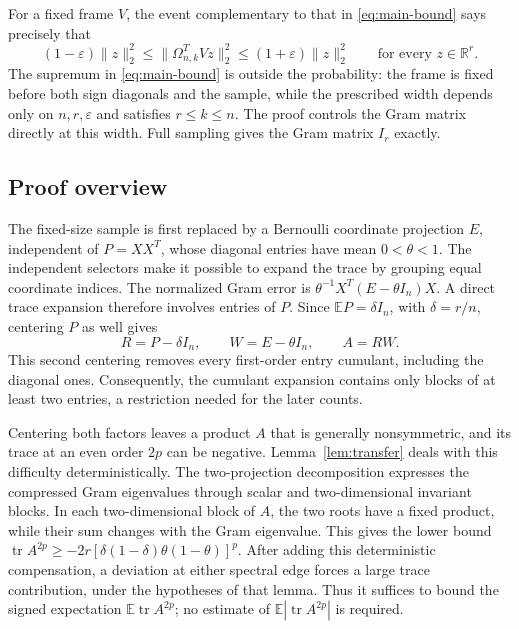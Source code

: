 \documentclass[11pt]{article}
\theoremstyle{definition}
\theoremstyle{remark}
\theoremstyle{plain}
\newcommand{\E}{\mathbb E}
\newcommand{\R}{\mathbb R}
\DeclareMathOperator{\tr}{tr}
\begin{document}
For a fixed frame $V$, the event complementary to that in
\eqref{eq:main-bound} says precisely that
\[
 (1-\varepsilon)\|z\|_2^2
 \le \|\Omega_{n,k}^T Vz\|_2^2
 \le (1+\varepsilon)\|z\|_2^2
 \qquad\text{for every }z\in\R^r.
\]
The supremum in \eqref{eq:main-bound} is outside the probability:
the frame is fixed before both sign diagonals and the sample, while
the prescribed width depends only on $n,r,\varepsilon$ and satisfies
$r\le k\le n$. The proof controls the Gram matrix directly at this
width. Full sampling gives the Gram matrix $I_r$ exactly.

\subsection*{Proof overview}

The fixed-size sample is first replaced by a Bernoulli coordinate
projection $E$, independent of $P=XX^T$, whose diagonal entries
have mean $0<\theta<1$. The independent selectors make it possible to
expand the trace by grouping equal coordinate indices. The normalized
Gram error is $\theta^{-1}X^T(E-\theta I_n)X$.
A direct trace expansion therefore involves entries of $P$.
Since $\E P=\delta I_n$, with $\delta=r/n$, centering $P$ as well gives
\[
 R=P-\delta I_n,\qquad W=E-\theta I_n,\qquad A=RW.
\]
This second centering removes every first-order entry cumulant,
including the diagonal ones. Consequently, the cumulant expansion
contains only blocks of at least two entries, a restriction needed
for the later counts.

Centering both factors leaves a product $A$ that is generally
nonsymmetric, and its trace at an even order $2p$ can be negative.
Lemma~\ref{lem:transfer} deals with this difficulty deterministically.
The two-projection decomposition expresses the compressed Gram
eigenvalues through scalar and two-dimensional invariant blocks.
In each two-dimensional block of $A$, the two roots have a fixed
product, while their sum changes with the Gram eigenvalue.
This gives the lower bound
$\tr A^{2p}\ge-2r[\delta(1-\delta)\theta(1-\theta)]^p$.
After adding this deterministic compensation, a deviation at either
spectral edge forces a large trace contribution, under the
hypotheses of that lemma. Thus it suffices to bound the signed
expectation $\E\tr A^{2p}$; no estimate of
$\E|\tr A^{2p}|$ is required.
\end{document}
